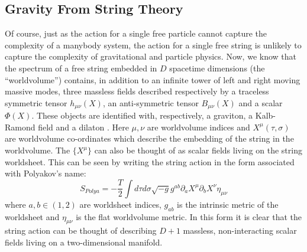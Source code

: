 \documentclass[a4paper]{article}
\begin{document}
\subsection{Gravity From String Theory}

Of course, just as the action for a single free particle cannot capture the complexity of a manybody system, the action for a single free string is unlikely to capture the complexity of gravitational and particle physics. Now, we know that the spectrum of a free string embedded in $ D $ spacetime dimensions (the ``worldvolume'') contains, in addition to an infinite tower of left and right moving massive modes, three massless fields described respectively by a traceless symmetric tensor $ h_{\mu\nu}(X) $, an anti-symmetric tensor $ B_{\mu\nu}(X) $ and a scalar $ \Phi(X) $. These objects are identified with, respectively, a graviton, a Kalb-Ramond field and a dilaton \cite[Sec 2.3.2]{Tong2010Lectures}. Here $ \mu, \nu $ are worldvolume indices and $ X^{\mu}(\tau,\sigma) $ are worldvolume co-ordinates which describe the embedding of the string in the worldvolume. The $ \{X^\mu\} $ can also be thought of as scalar fields living on the string worldsheet. This can be seen by writing the string action in the form associated with Polyakov's name:
\begin{equation}\label{eqn:polyakov-flat}
	S_{Polya} = -\frac{T}{2} \int d\tau d\sigma \sqrt{-g} g^{ab} \partial_a X^\mu \partial_b X^\nu \eta_{\mu\nu}
\end{equation}
where $ a,b \in (1,2) $ are worldsheet indices, $ g_{ab} $ is the intrinsic metric of the worldsheet and $ \eta_{\mu\nu} $ is the flat worldvolume metric. In this form it is clear that the string action can be thought of describing $ D+1 $ massless, non-interacting scalar fields living on a two-dimensional manifold.
\end{document}
